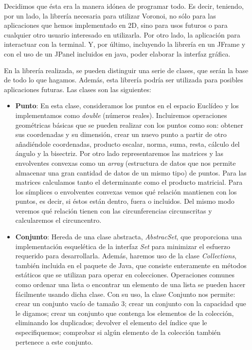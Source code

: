 Decidimos que ésta era la manera idónea de programar todo. Es decir, teniendo, por un lado, la librería necesaria para utilizar Voronoi, no sólo para las aplicaciones que hemos implementado en 2D, sino para usos futuros o para cualquier otro usuario interesado en utilizarla. Por otro lado, la aplicación para interactuar con la terminal. Y, por último, incluyendo la librería en un JFrame y con el uso de un JPanel incluidos en java, poder elaborar la interfaz gráfica.
\vspace{0.3cm} 

En la librería realizada, se pueden distinguir una serie de clases, que serán la base de todo lo que hagamos. Además, esta librería podría ser utilizada para posibles aplicaciones futuras. Las clases son las siguientes:

\begin{itemize}
    \item \textbf{Punto}: En esta clase, consideramos los puntos en el espacio Euclídeo y los implementamos como \textit{double} (números reales). Incluiremos operaciones geométricas básicas que se pueden realizar con los puntos como son: obtener sus coordenadas y su dimensión, crear un nuevo punto a partir de otro añadiéndole coordenadas, producto escalar, norma, suma, resta, cálculo del ángulo y la bisectriz. Por otro lado representaremos las matrices y las envolventes convexas como un \textit{array} (estructura de datos que nos permite almacenar una gran cantidad de datos de un mismo tipo) de puntos. Para las matrices calculamos tanto el determinante como el producto matricial. Para los símplices o envolventes convexas vemos qué relación mantienen con los puntos, es decir, si éstos están dentro, fuera o incluidos. Del mismo modo veremos qué relación tienen con las circunferencias circunscritas y calcularemos el circuncentro.
    \item \textbf{Conjunto}: Hereda de una clase abstracta, \textit{AbstracSet}, que proporciona una implementación esquelética de la interfaz \textit{Set} para minimizar el esfuerzo requerido para desarrollarla. Además, haremos uso de la clase \textit{Collections}, también incluida en el paquete de Java, que consiste enteramente en métodos estáticos que se utilizan para operar en colecciones. Operaciones comunes como ordenar una lista o encontrar un elemento de una lista se pueden hacer fácilmente usando dicha clase. Con su uso, la clase Conjunto nos permite: crear un conjunto vacío de tamaño 3; crear un conjunto con la capacidad que le digamos; crear un conjunto que contenga los elementos de la colección, eliminando los duplicados; devolver el elemento del índice que le especifiquemos; comprobar si algún elemento de la colección también pertenece a este conjunto.

\end{itemize}
